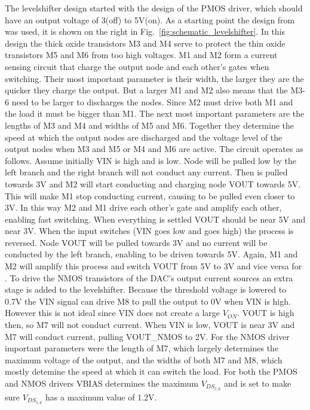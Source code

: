 The levelshifter design started with the design of the PMOS driver, which should have an output voltage of 3(off) to 5V(on). As a starting point the design from~\cite{powerdac} was used, it is shown on the right in Fig.~\ref{fig:schematic_levelshifter}. In this design the thick oxide transistors M3 and M4 serve to protect the thin oxide transistors M5 and M6 from too high voltages. M1 and M2 form a current sensing circuit that charge the output node and each other's gates when switching. Their most important parameter is their width, the larger they are the quicker they charge the output. But a larger M1 and M2 also means that the M3-6 need to be larger to discharges the nodes. Since M2 must drive both M1 and the load it must be bigger than M1. The next most important parameters are the lengths of M3 and M4 and widths of M5 and M6. Together they determine the speed at which the output nodes are discharged and the voltage level of the output nodes when M3 and M5 or M4 and M6 are active. The circuit operates as follows. Assume initially VIN is high and  is low. Node  will be pulled low by the left branch and the right branch will not conduct any current. Then  is pulled towards 3V and M2 will start conducting and charging node VOUT towards 5V. This will make M1 stop conducting current, causing  to be pulled even closer to 3V. In this way M2 and M1 drive each other's gate and amplify each other, enabling fast switching. When everything is settled VOUT should be near 5V and  near 3V. When the input switches (VIN goes low and  goes high) the process is reversed. Node VOUT will be pulled towards 3V and no current will be conducted by the left branch, enabling  to be driven towards 5V. Again, M1 and M2 will amplify this process and switch VOUT from 5V to 3V and vice versa for .
To drive the NMOS transistors of the DAC's output current sources an extra stage is added to the levelshifter. Because the threshold voltage is lowered to 0.7V the VIN signal can drive M8 to pull the output to 0V when VIN is high. However this is not ideal since VIN does not create a large $V_{ON}$. VOUT is high then, so M7 will not conduct current. When VIN is low, VOUT is near 3V and M7 will conduct current, pulling VOUT\_NMOS to 2V. For the NMOS driver important parameters were the length of M7, which largely determines the maximum voltage of the output, and the widths of both M7 and M8, which mostly detemine the speed at which it can switch the load. For both the PMOS and NMOS drivers VBIAS determines the maximum $V_{DS_{5,6}}$ and is set to make sure $V_{DS_{5,6}}$ has a maximum value of 1.2V.

